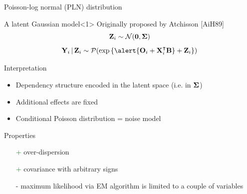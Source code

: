 \documentclass[10pt, c, xcolor=x11names]{beamer}\usepackage[]{graphicx}\usepackage[]{color}
\begin{document}
\begin{frame}{{P}oisson-log normal (PLN) distribution}

\begin{small}

  \begin{block}{A latent Gaussian model}<1>
  Originally proposed by Atchisson [AiH89]
  \[
    \mathbf{Z}_i \sim \mathcal{N}(\mathbf{0}, \boldsymbol\Sigma)
  \]
  \[
    \bY_i \,|\, \bZ_i \sim \clP(\exp{\{\alert{\bO_i + \bX_i^\intercal \bB} + \bZ_i\}})
  \]
  \end{block}

  \vfill
  \vspace{-.25cm}

  \begin{block}{Interpretation}
    \vspace{-.25cm}
  \begin{itemize}
   \item Dependency structure encoded in the latent space (i.e. in $\boldsymbol{\Sigma}$)
   \item Additional effects are fixed
   \item Conditional Poisson distribution = noise model
  \end{itemize}
  \end{block}

  \vspace{-.25cm}

  \begin{block}{Properties}
    \vspace{-.25cm}
      \begin{itemize}
        \item[\textcolor{green}{+}] over-dispersion
        \item[\textcolor{green}{+}] covariance with arbitrary signs
        \item[\textcolor{mred}{-}] maximum likelihood via EM algorithm is limited to a couple of variables
      \end{itemize}
  \end{block}

\end{small}

\end{frame}
\end{document}
